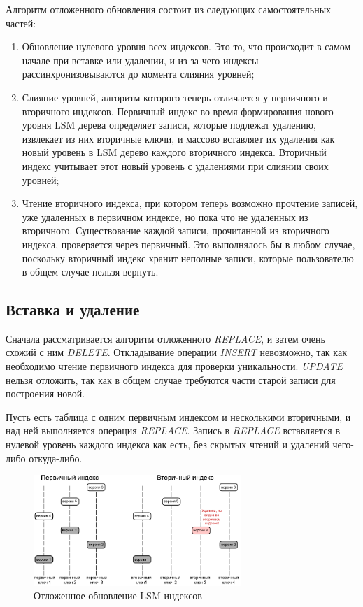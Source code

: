 \documentclass[a4paper,hidelinks,12pt]{article}
\begin{document}
Алгоритм отложенного обновления состоит из следующих самостоятельных частей:
\begin{enumerate}
\item Обновление нулевого уровня всех индексов. Это то, что происходит в самом
начале при вставке или удалении, и из-за чего индексы рассинхронизовываются до
момента слияния уровней;
\item Слияние уровней, алгоритм которого теперь отличается у первичного и
вторичного индексов. Первичный индекс во время формирования нового уровня LSM
дерева определяет записи, которые подлежат удалению, извлекает из них вторичные
ключи, и массово вставляет их удаления как новый уровень в LSM дерево каждого
вторичного индекса. Вторичный индекс учитывает этот новый уровень с удалениями
при слиянии своих уровней;
\item Чтение вторичного индекса, при котором теперь возможно прочтение записей,
уже удаленных в первичном индексе, но пока что не удаленных из вторичного.
Существование каждой записи, прочитанной из вторичного индекса, проверяется
через первичный. Это выполнялось бы в любом случае, поскольку вторичный индекс
хранит неполные записи, которые пользователю в общем случае нельзя вернуть.
\end{enumerate}

\subsection{Вставка и удаление}
Сначала рассматривается алгоритм отложенного \textit{REPLACE}, и затем очень
схожий с ним \textit{DELETE}. Откладывание операции \textit{INSERT} невозможно,
так как необходимо чтение первичного индекса для проверки уникальности.
\textit{UPDATE} нельзя отложить, так как в общем случае требуются части старой
записи для построения новой.

Пусть есть таблица с одним первичным индексом и несколькими вторичными, и над
ней выполняется операция \textit{REPLACE}. Запись в \textit{REPLACE} вставляется
в нулевой уровень каждого индекса как есть, без скрытых чтений и удалений
чего-либо откуда-либо.

\begin{figure}[h]
\centering
\includegraphics[width=0.7\textwidth]{table_after_deferred_update}
\caption{Отложенное обновление LSM индексов}
\label{fig:table_after_deferred_update}
\end{figure}
\end{document}

